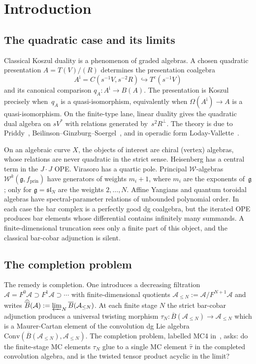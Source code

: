 \documentclass[11pt,reqno]{amsart}
\theoremstyle{definition}
\theoremstyle{remark}
\newcommand{\cA}{\mathcal{A}}
\newcommand{\cW}{\mathcal{W}}
\newcommand{\barB}{\overline{B}}
\newcommand{\fg}{\mathfrak{g}}
\newcommand{\Conv}{\mathrm{Conv}}
\numberwithin{equation}{section}
\begin{document}

\section{Introduction}\label{sec:intro}

\subsection{The quadratic case and its limits}

Classical Koszul duality is a phenomenon of graded algebras.
A chosen quadratic presentation $A = T(V)/(R)$ determines the
presentation coalgebra
\[
 A^{\mathrm i}=C(s^{-1}V,s^{-2}R)
 \hookrightarrow T^c(s^{-1}V)
\]
and its canonical comparison $q_A\colon A^{\mathrm i}\to B(A)$.
The presentation is Koszul precisely when~$q_A$ is a
quasi-isomorphism, equivalently when
$\Omega(A^{\mathrm i})\to A$ is a quasi-isomorphism.  On the
finite-type lane, linear duality gives the quadratic dual algebra on
$sV^*$ with relations generated by~$s^2R^\perp$. The theory is due to
Priddy~\cite{Priddy70}, Beilinson--Ginzburg--Soergel~\cite{BGS},
and in
operadic form Loday-Vallette~\cite{LV12}.

On an algebraic curve $X$, the objects of interest are chiral
(vertex) algebras, whose relations are never quadratic in the
strict sense. Heisenberg has a central term in the
$J \cdot J$ OPE. Virasoro has a quartic pole. Principal
$\cW$-algebras $\cW^k(\fg, f_{\mathrm{prin}})$ have generators
of weights $m_i+1$, where $m_i$ are the exponents of~$\fg$;
only for $\fg=\mathfrak{sl}_N$ are the weights $2,\ldots,N$.
Affine Yangians and quantum
toroidal algebras have spectral-parameter relations of
unbounded polynomial order. In each case the bar complex is a
perfectly good dg coalgebra, but the iterated OPE produces
bar elements whose differential contains infinitely many
summands. A finite-dimensional truncation sees only a finite
part of this object, and the classical bar-cobar adjunction is
silent.

\subsection{The completion problem}

The remedy is completion. One introduces a decreasing
filtration
$\cA = F^0\cA \supset F^1\cA \supset \cdots$
with finite-dimensional quotients
$\cA_{\le N} := \cA/F^{N+1}\cA$ and writes
$\widehat{\barB}(\cA) := \varprojlim_N \barB(\cA_{\le N})$.
At each finite stage $N$ the strict bar-cobar adjunction
produces a universal twisting morphism
$\tau_N \colon \barB(\cA_{\le N}) \to \cA_{\le N}$
which is a Maurer-Cartan element of the convolution dg Lie
algebra
$\Conv(\barB(\cA_{\le N}), \cA_{\le N})$. The completion
problem, labelled MC4 in~\cite{LorgatI}, asks: do the
finite-stage MC elements $\tau_N$ glue to a single MC
element $\widehat\tau$ in the completed convolution
algebra, and is the twisted tensor product acyclic in the
limit?
\end{document}
